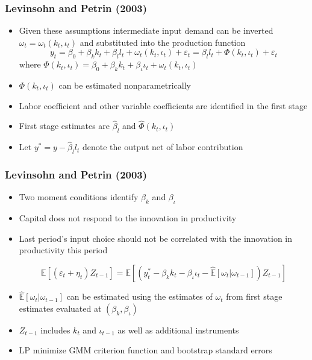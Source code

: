 \documentclass{beamer}
\begin{document}
\begin{frame}
\frametitle{Levinsohn and Petrin (2003)}
\begin{itemize}
	\item Given these assumptions intermediate input demand can be inverted $\omega_{t}=\omega_{t}(k_{t}, \iota_{t})$ and substituted into the production function
	\begin{equation}
		y_{t}=\beta_{0}+\beta_{k}k_{t}+\beta_{l}l_{t}+\omega_{t}(k_{t}, \iota_{t})+\varepsilon_{t}=\beta_{l}l_{t}+\Phi(k_{t}, \iota_{t})+\varepsilon_{t}
	\end{equation}
	where $\Phi(k_{t}, \iota_{t})=\beta_{0}+\beta_{k}k_{t}+\beta_{\iota}\iota_{t}+\omega_{t}(k_{t}, \iota_{t})$
	
	\item $\Phi(k_{t}, \iota_{t})$ can be estimated nonparametrically
	\item Labor coefficient and other variable coefficients are identified in the first stage
	\item First stage estimates are $\hat{\beta}_{l}$ and $\hat{\Phi}(k_{t}, \iota_{t})$ 
	\item Let $y^{*}=y-\hat{\beta}_{l}l_{t}$ denote the output net of labor contribution
\end{itemize}
\end{frame}


\begin{frame}
\frametitle{Levinsohn and Petrin (2003)}
\begin{itemize}
	\item Two moment conditions identify $\beta_{k}$ and $\beta_{\iota}$
	\item Capital does not respond to the innovation in productivity 
	\item Last period's input choice should not be correlated with the innovation in productivity this period
	
	\begin{equation}
	\mathbb{E}[(\varepsilon_{t}+\eta_{t})Z_{t-1}]=\mathbb{E}[(y_{t}^{*}-\beta_{k}k_{t}-\beta_{\iota}\iota_{t}-\hat{\mathbb{E}}[\omega_{t}|\omega_{t-1}])Z_{t-1}]
	\end{equation}
	
	\item $\hat{\mathbb{E}}[\omega_{t}|\omega_{t-1}]$ can be estimated using the estimates of $\omega_{t}$ from first stage estimates evaluated at $(\beta_{k}, \beta_{\iota})$
	\item $Z_{t-1}$ includes $k_{t}$ and $\iota_{t-1}$ as well as additional instruments
	\item LP minimize GMM criterion function and bootstrap standard errors 
\end{itemize}
\end{frame}
\end{document}
